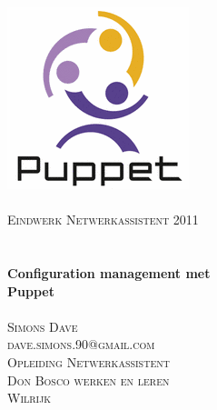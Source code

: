 \begin{titlepage}
\begin{center}

\includegraphics{src/puppet_logo.png}\\
\textsc{\Large }\\[2.5cm]

\textsc{\Large Eindwerk Netwerkassistent 2011}\\
\textsc{\Large }\\[-0.5cm]
\HRule\\
{\huge{\bfseries Configuration management met\\Puppet}}
\HRule\\
\textsc{\Large }\\[2.5cm]

\textsc{Simons Dave}\\
\textsc{dave.simons.90@gmail.com}\\
\textsc{Opleiding Netwerkassistent}\\
\textsc{Don Bosco werken en leren}\\
\textsc{Wilrijk}

\end{center}
\end{titlepage}

